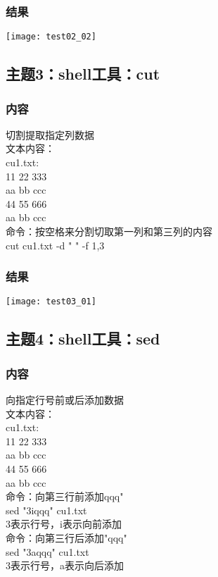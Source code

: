 \documentclass{article}
\begin{document}
\subsubsection{结果} 
\texttt{[image: test02\_02]}\\
\subsection{主题3：shell工具：cut}  
\subsubsection{内容}
切割提取指定列数据\\
文本内容：\\
cu1.txt:\\
11 22 333\\
aa bb ccc\\
44 55 666\\
aa bb ccc\\
命令：按空格来分割切取第一列和第三列的内容\\
cut cu1.txt -d " " -f 1,3\\
\subsubsection{结果} 
\texttt{[image: test03\_01]}\\
\subsection{主题4：shell工具：sed}  
\subsubsection{内容}
向指定行号前或后添加数据\\
文本内容：\\
cu1.txt:\\
11 22 333\\
aa bb ccc\\
44 55 666\\
aa bb ccc\\
命令：向第三行前添加qqq"\\
sed "3iqqq" cu1.txt\\
3表示行号，i表示向前添加\\
命令：向第三行后添加"qqq"\\
sed "3aqqq" cu1.txt\\
3表示行号，a表示向后添加\\
\end{document}
